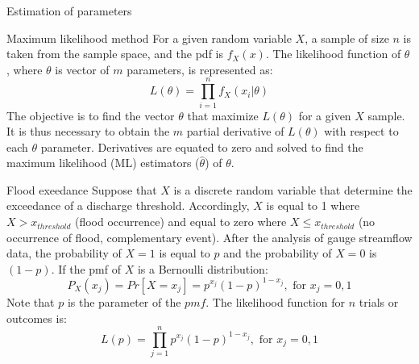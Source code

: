 \documentclass[8pt]{beamer}
\renewcommand{\emph}[1]{\textcolor{myorange}{#1}}
\begin{document}
\begin{frame}{Estimation of parameters}
    \begin{block}{Maximum likelihood method}
        For a given random variable $X$, a sample of size $n$ is taken from the  sample space, and the \emph{pdf} is $f_X (x)$. The \alert{likelihood function} of $\theta$, where $\theta$ is vector of $m$ parameters, is represented as:
        \[
            L (\theta) = \prod_{i=1}^n f_X (x_i | \theta )
        \]
        The objective is to  find the vector $\theta$ that maximize $L(\theta)$ for a given $X$ sample. It is thus necessary to obtain the $m$ partial derivative of $L(\theta)$ with respect to each $\theta$ parameter. Derivatives are equated to zero and solved  to find the \alert{maximum likelihood (ML)} estimators ($\hat{\theta}$) of $\theta$.  
    \end{block}

        \vspace{-3pt}
    \begin{exampleblock}{Flood exeedance}
        Suppose that $X$ is a discrete random variable that determine the exceedance of a discharge threshold. Accordingly, $X$ is equal to 1 where $X > x_{threshold}$ (flood occurrence) and equal to zero where $X \leq x_{threshold}$ (no occurrence of flood, complementary event). After the analysis of gauge streamflow data, the probability of $X = 1$ is equal to $p$ and the probability of $X = 0$ is $(1-p)$. If the \emph{pmf} of $X$ is a \emph{Bernoulli distribution}:
        \[
            P_X (x_j) = Pr [X = x_j] = p^{x_j} (1-p)^{1-x_j}, \text{ for } x_j = 0, 1
        \]
        Note that $p$ is the parameter of the $pmf$. The \emph{likelihood function} for $n$ trials or outcomes is:
        \vspace{-3pt}
        \[
            L (p) = \prod_{j=1}^n p^{x_j} (1-p)^{1-x_j}, \text{ for } x_j = 0, 1
        \]
    \end{exampleblock}
\end{frame}
\end{document}
